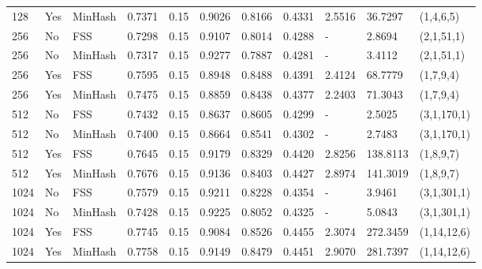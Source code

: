 \begin{table}[!htb]
\begin{tabular}{|l|l|l|l|l|l|l|l|l|l|l|}
       128 &       Yes &     MinHash & 0.7371 &       0.15 &             0.9026 &           0.8166 & 0.4331 &          2.5516 &     36.7297 &   (1,4,6,5) \\
       256 &        No &         FSS & 0.7298 &       0.15 &             0.9107 &           0.8014 & 0.4288 &                 - &      2.8694 &  (2,1,51,1) \\
       256 &        No &     MinHash & 0.7317 &       0.15 &             0.9277 &           0.7887 & 0.4281 &                 - &      3.4112 &  (2,1,51,1) \\
       256 &       Yes &         FSS & 0.7595 &       0.15 &             0.8948 &           0.8488 & 0.4391 &           2.4124 &     68.7779 &   (1,7,9,4) \\
       256 &       Yes &     MinHash & 0.7475 &       0.15 &             0.8859 &           0.8438 & 0.4377 &          2.2403 &     71.3043 &   (1,7,9,4) \\
       512 &        No &         FSS & 0.7432 &       0.15 &             0.8637 &           0.8605 & 0.4299 &                 - &      2.5025 & (3,1,170,1) \\
       512 &        No &     MinHash & 0.7400 &       0.15 &             0.8664 &           0.8541 & 0.4302 &                 - &      2.7483 & (3,1,170,1) \\
       512 &       Yes &         FSS & 0.7645 &       0.15 &             0.9179 &           0.8329 & 0.4420 &          2.8256 &    138.8113 &   (1,8,9,7) \\
       512 &       Yes &     MinHash & 0.7676 &       0.15 &             0.9136 &           0.8403 & 0.4427 &          2.8974 &    141.3019 &   (1,8,9,7) \\
      1024 &        No &         FSS & 0.7579 &       0.15 &             0.9211 &           0.8228 & 0.4354 &                 - &      3.9461 & (3,1,301,1) \\
      1024 &        No &     MinHash & 0.7428 &       0.15 &             0.9225 &           0.8052 & 0.4325 &                 - &      5.0843 & (3,1,301,1) \\
      1024 &       Yes &         FSS & 0.7745 &       0.15 &             0.9084 &           0.8526 & 0.4455 &          2.3074 &    272.3459 & (1,14,12,6) \\
      1024 &       Yes &     MinHash & 0.7758 &       0.15 &             0.9149 &           0.8479 & 0.4451 &          2.9070 &    281.7397 & (1,14,12,6) \\
      \hline


    \end{tabular}
    \label{table:alpha_max_results}
\end{table}


